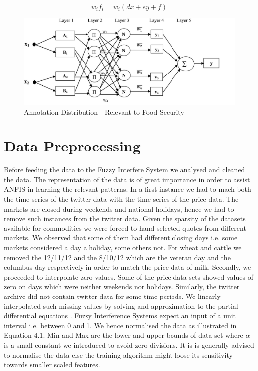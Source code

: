  \begin{equation} \label{eq:layer4}
 \overline{w_i} f_i =  \overline{w_i }(dx + ey + f) \end{equation}



\begin{figure}[H]
        \centering
         \includegraphics[width=1\textwidth ]{img/model/gnn_fuzz}      
        \caption{Annotation Distribution - Relevant to Food Security}
        \label{fig:gnn_fuzz}
\end{figure}





\section{Data Preprocessing}
\label{dataprocessing}

Before feeding the data to the Fuzzy Interfere System we analysed and cleaned the data. The representation of the data is of great importance in order to assist ANFIS in learning the relevant patterns. In a first instance we had to mach both the time series of the twitter data with the time series of the price data. The markets are closed during weekends and national holidays, hence we had to remove such instances from the twitter data. Given the sparsity of the datasets available for commodities we were forced to hand selected quotes from different markets. We observed that some of them had different closing days i.e. some markets considered a day a holiday, some others not. For wheat and cattle we removed the 12/11/12 and the 8/10/12 which are the veteran day and the columbus day respectively in order to match the price data of milk.  Secondly, we proceeded to interpolate zero values. Some of the price data-sets showed values of zero on days which were neither weekends nor holidays. Similarly, the twitter archive did not contain  twitter data for some time periods. We linearly interpolated such missing values by solving and approximation to the partial differential equations \cite{john2012}.  Fuzzy Interference Systems expect an input of a unit interval i.e. between 0 and 1. We hence normalised the data as illustrated in Equation 4.1. Min and Max are the lower and upper bounds of data set where $\alpha$ is a small constant we introduced to avoid zero divisions. It is is generally advised to normalise the data else the training algorithm might loose its sensitivity towards smaller scaled features. 

